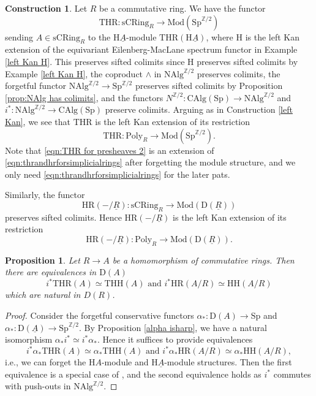 \documentclass[10pt]{amsart}
\newtheorem{prop}[thm]{Proposition}
\theoremstyle{definition}
\newtheorem{const}[thm]{Construction}
\numberwithin{equation}{section}
\newcommand{\Z}{\mathbb{Z}}
\newcommand{\rD}{\mathrm{D}}
\newcommand{\rH}{\mathrm{H}}
\newcommand{\ul}{\underline}
\newcommand{\CAlg}{\mathrm{CAlg}}
\newcommand{\sCRing}{\mathrm{sCRing}}
\newcommand{\Mod}{\mathrm{Mod}}
\newcommand{\NAlg}{\mathrm{NAlg}}
\newcommand{\Sp}{\mathrm{Sp}}
\newcommand{\Poly}{\mathrm{Poly}}
\newcommand{\HH}{\mathrm{HH}}
\newcommand{\HR}{\mathrm{HR}}
\newcommand{\THH}{\mathrm{THH}}
\newcommand{\THR}{\mathrm{THR}}
\begin{document}
\begin{const}\label{thrandhrforsimplicialrings}
Let $R$ be a commutative ring.
We have the functor
\begin{equation}
\label{eqn:thrandhrforsimplicialrings}
\THR
\colon
\sCRing_R
\to
\Mod(\Sp^{\Z/2})
\end{equation}
sending $A\in \sCRing_R$ to the $\rH \ul{A}$-module $\THR(\rH \ul{A})$,
where $\rH$ is the left Kan extension of the equivariant Eilenberg-MacLane spectrum functor in Example \ref{left Kan H}.
This preserves sifted colimits since $\rH$ preserves sifted colimits by Example \ref{left Kan H},
the coproduct $\wedge$ in $\NAlg^{\Z/2}$ preserves colimits,
the forgetful functor $\NAlg^{\Z/2}\to \Sp^{\Z/2}$ preserves sifted colimits by Proposition \ref{prop:NAlg has colimits},
and the functors $N^{\Z/2}\colon \CAlg(\Sp)\to \NAlg^{\Z/2}$ and $i^*\colon \NAlg^{\Z/2}\to \CAlg(\Sp)$ preserve colimits.
Arguing as in Construction \ref{left Kan},
we see that $\THR$ is the left Kan extension of its restriction
\[
\THR\colon \Poly_R\to \Mod(\Sp^{\Z/2}).
\]
Note that \eqref{eqn:THR for presheaves 2} is an extension of \eqref{eqn:thrandhrforsimplicialrings} after forgetting the module structure,
and we only need \eqref{eqn:thrandhrforsimplicialrings} for the later pats.

Similarly,
the functor
\[
\HR(-/\ul{R})
\colon
\sCRing_R
\to
\Mod(\rD(\ul{R}))
\]
preserves sifted colimits.
Hence $\HR(-/\ul{R})$ is the left Kan extension of its restriction
\[
\HR(-/\ul{R})
\colon
\Poly_R
\to
\Mod(\rD(\ul{R})).
\]
\end{const}




\begin{prop}
\label{i* and THR}
Let $R\to A$ be a homomorphism of commutative rings.
Then there are equivalences in $\rD(A)$
\[
i^*\THR(A)
\simeq
\THH(A)
\text{ and }
i^*\HR(A/R)
\simeq
\HH(A/R)
\]
which are natural in $D(R)$.
\end{prop}
\begin{proof}
Consider the forgetful conservative functors $\alpha_*\colon \rD(A)\to \Sp$ and $\alpha_*\colon \rD(\ul{A})\to \Sp^{\Z/2}$.
By Proposition \ref{alpha isharp},
we have a natural isomorphism $\alpha_* i^*\simeq i^*\alpha_*$.
Hence it suffices to provide equivalences
\[
i^*\alpha_*\THR(A)
\simeq
\alpha_*\THH(A)
\text{ and }
i^*\alpha_* \HR(A/R)
\simeq
\alpha_*\HH(A/R),
\]
i.e.,
we can forget the $\rH A$-module and $\rH \ul{A}$-module structures.
Then the first equivalence is a special case of \cite[Proposition 2.1.3]{HP23}, and the second equivalence holds as $i^*$ commutes with push-outs in $\NAlg^{\Z/2}$.
\end{proof}
\end{document}
